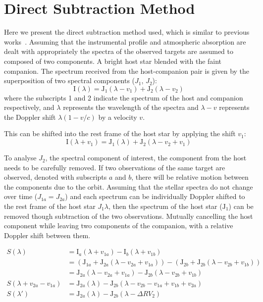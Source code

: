 \section{Direct Subtraction Method}
\label{sec:direct-subtraction}
Here we present the direct subtraction method used, which is similar to previous works~\citep{ferluga_separating_1997,kostogryz_spectral_2013}. Assuming that the instrumental profile and atmospheric absorption are dealt with appropriately the spectra of the observed targets are assumed to composed of two components. A bright host star blended with the faint companion. The spectrum received from the host-companion pair is given by the superposition of two spectral components (\(J_{1}\), \(J_{2}\)):
\begin{equation}
\textrm{I}(\lambda) = \textrm{J}_{1}(\lambda - v_{1}) + \textrm{J}_{2}(\lambda - v_{2})
\end{equation}
where the subscripts 1 and 2 indicate the spectrum of the host and companion respectively, and \(\lambda\) represents the wavelength of the spectra and \(\lambda-v\) represents the Doppler shift \(\lambda(1-v/c)\) by a velocity \(v\).

This can be shifted into the rest frame of the host star by applying the shift \(v_1\):
\begin{equation}
\textrm{I}(\lambda + v_{1}) = \textrm{J}_{1}(\lambda) + \textrm{J}_{2}(\lambda - v_{2} + v_{1})
\end{equation}

To analyse \(J_2\), the spectral component of interest, the component from the host needs to be carefully removed. If two observations of the same target are observed, denoted with subscripts \(a\) and \(b\), there will be relative motion between the components due to the orbit. Assuming that the stellar spectra do not change over time (\(J_{1a} = J_{2a}\)) and each spectrum can be individually Doppler shifted to the rest frame of the host star \(J_1{\lambda}\), then the spectrum of the host star (\(\textrm{J}_{1}\)) can be removed though subtraction of the two observations. Mutually cancelling the host component while leaving two components of the companion, with a relative Doppler shift between them.

\begin{align}
S(\lambda) &= \textrm{I}_{a}(\lambda + v_{1a}) - \textrm{I}_{b}(\lambda + v_{1b}) \nonumber \\
&= (\textrm{J}_{1a} + \textrm{J}_{2a}(\lambda - v_{2a} + v_{1a})) - (\textrm{J}_{2b} +\textrm{J}_{2b}(\lambda - v_{2b} + v_{1b})) \nonumber \\
&= \textrm{J}_{2a}(\lambda - v_{2a} + v_{1a}) - \textrm{J}_{2b}(\lambda - v_{2b} + v_{1b}) \nonumber \\
S(\lambda + v_{2a}-v_{1a}) &= \textrm{J}_{2a}(\lambda) - \textrm{J}_{2b}(\lambda - v_{2b} - v_{1a} + v_{1b} + v_{2a})\\
S(\lambda') &= \textrm{J}_{2a}(\lambda) - \textrm{J}_{2b}(\lambda - \Delta {RV}_2) \label{eqn:sprofile}
\end{align}

